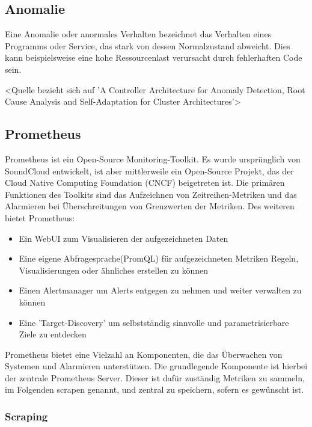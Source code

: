 \documentclass[a4paper,12pt]{scrartcl}
\begin{document}
\subsection{Anomalie}

Eine Anomalie oder anormales Verhalten bezeichnet das Verhalten eines Programms oder Service, das stark von dessen Normalzustand abweicht. Dies kann beispielsweise eine hohe Ressourcenlast verursacht durch fehlerhaften Code sein.

<Quelle bezieht sich auf 'A Controller Architecture for Anomaly Detection, Root Cause Analysis and Self-Adaptation for Cluster Architectures'>

\subsection{Prometheus}

Prometheus ist ein Open-Source Monitoring-Toolkit. Es wurde ursprünglich von SoundCloud entwickelt, ist aber mittlerweile ein Open-Source Projekt, das der Cloud Native
Computing Foundation (CNCF) beigetreten ist. Die primären Funktionen des Toolkits
sind das Aufzeichnen von Zeitreihen-Metriken und das Alarmieren bei Überschreitungen
von Grenzwerten der Metriken. Des weiteren bietet Prometheus:\\

\begin{itemize}
\item Ein WebUI zum Visualisieren der aufgezeichneten Daten
\item Eine eigene Abfragesprache(PromQL) für aufgezeichneten Metriken Regeln, Visualisierungen oder ähnliches erstellen zu können
\item Einen Alertmanager um Alerts entgegen zu nehmen und weiter verwalten zu können
\item Eine 'Target-Discovery' um selbstständig sinnvolle und parametrisierbare Ziele zu entdecken

\end{itemize}

Prometheus bietet eine Vielzahl an Komponenten, die das Überwachen von Systemen und Alarmieren unterstützen. Die grundlegende Komponente ist hierbei der zentrale Prometheus Server. Dieser ist dafür zuständig Metriken zu sammeln, im Folgenden scrapen genannt, und zentral zu speichern, sofern es gewünscht ist.

\subsubsection{Scraping}
\end{document}

